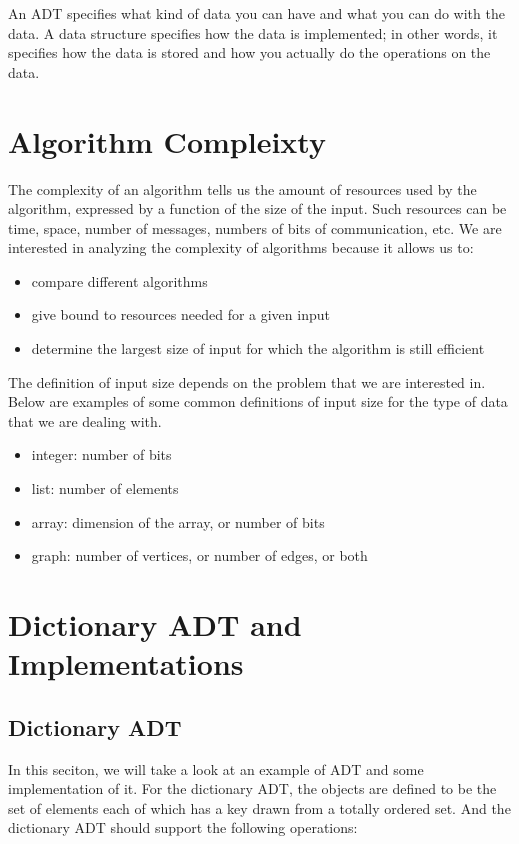 An ADT specifies what kind of data you can have and what you can do with the data. A data structure specifies how the data is implemented; in other words, it specifies how the data is stored and how you actually do the operations on the data.

\section{Algorithm Compleixty}

The complexity of an algorithm tells us the amount of resources used by the algorithm, expressed by a function of the size of the input. Such resources can be time, space, number of messages, numbers of bits of communication, etc. We are interested in analyzing the complexity of algorithms because it allows us to:

\begin{itemize}
    \item compare different algorithms
    \item give bound to resources needed for a given input
    \item determine the largest size of input for which the algorithm is still efficient
\end{itemize}

The definition of input size depends on the problem that we are interested in. Below are examples of some common definitions of input size for the type of data that we are dealing with.

\begin{itemize}
    \item integer: number of bits
    \item list: number of elements
    \item array: dimension of the array, or number of bits
    \item graph: number of vertices, or number of edges, or both
\end{itemize}

\section{Dictionary ADT and Implementations}

\subsection{Dictionary ADT}

In this seciton, we will take a look at an example of ADT and some implementation of it. For the dictionary ADT, the objects are defined to be the set of elements each of which has a key drawn from a totally ordered set. And the dictionary ADT should support the following operations:

